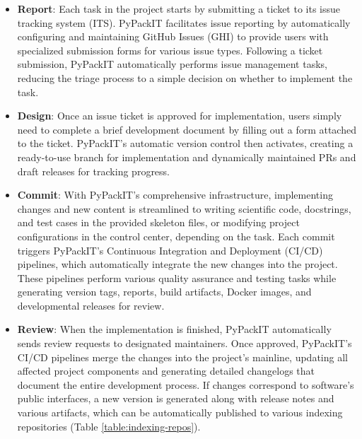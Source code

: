 \documentclass{article}
\begin{document}
\begin{itemize}
    \item \textbf{Report}: Each task in the project starts by submitting a ticket to its issue tracking system (ITS). PyPackIT facilitates issue reporting by automatically configuring and maintaining GitHub Issues (GHI) to provide users with specialized submission forms for various issue types. Following a ticket submission, PyPackIT automatically performs issue management tasks, reducing the triage process to a simple decision on whether to implement the task.
    \item \textbf{Design}: Once an issue ticket is approved for implementation, users simply need to complete a brief development document by filling out a form attached to the ticket. PyPackIT's automatic version control then activates, creating a ready-to-use branch for implementation and dynamically maintained PRs and draft releases for tracking progress.
    \item \textbf{Commit}: With PyPackIT's comprehensive infrastructure, implementing changes and new content is streamlined to writing scientific code, docstrings, and test cases in the provided skeleton files, or modifying project configurations in the control center, depending on the task. Each commit triggers PyPackIT's Continuous Integration and Deployment (CI/CD) pipelines, which automatically integrate the new changes into the project. These pipelines perform various quality assurance and testing tasks while generating version tags, reports, build artifacts, Docker images, and developmental releases for review.
    \item \textbf{Review}: When the implementation is finished, PyPackIT automatically sends review requests to designated maintainers. Once approved, PyPackIT's CI/CD pipelines merge the changes into the project's mainline, updating all affected project components and generating detailed changelogs that document the entire development process. If changes correspond to software's public interfaces, a new version is generated along with release notes and various artifacts, which can be automatically published to various indexing repositories (Table \ref{table:indexing-repos}). 
\end{itemize}
\end{document}
